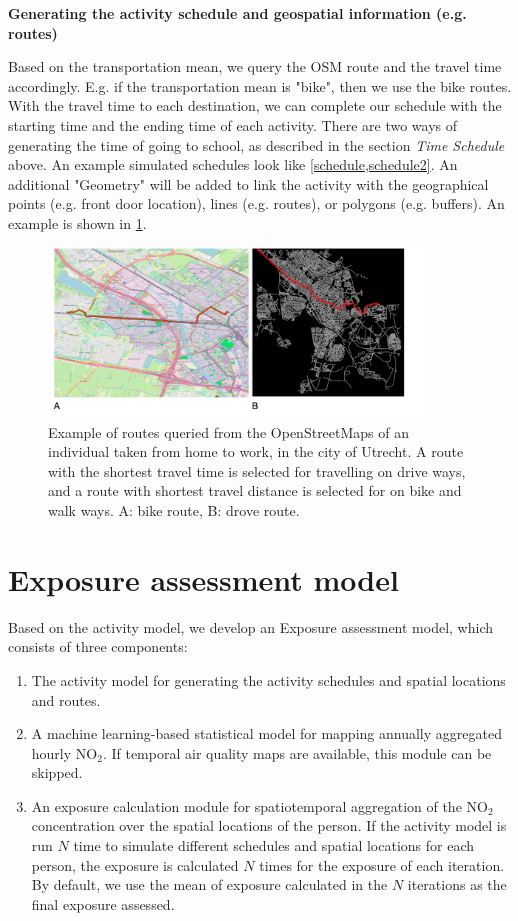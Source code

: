 \documentclass[]{article}
\begin{document}
\textbf{Generating the activity schedule and geospatial information (e.g. routes)}

Based on the transportation mean, we query the OSM route and the travel time accordingly. E.g. if the transportation mean is "bike", then we use the bike routes. With the travel time to each destination, we can complete our schedule with the starting time and the ending time of each activity. There are two ways of generating the time of going to school, as described in the section \textit{Time Schedule} above. An example simulated schedules look like \cref{schedule,schedule2}. An additional "Geometry" will be added to link the activity with the geographical points (e.g. front door location), lines (e.g. routes), or polygons (e.g. buffers). An example is shown in \cref{exampleroute}.
\begin{figure}[!h]
    \centering
    \includegraphics[width=10cm]{figure/route.png}
    \caption{Example of routes queried from the OpenStreetMaps of an individual taken from home to work, in the city of Utrecht. A route with the shortest travel time is selected for travelling on drive ways, and a route with shortest travel distance is selected for on bike and walk ways. A: bike route, B: drove route.}
    \label{exampleroute}
\end{figure}
%


\section{Exposure assessment model}
\label{sec:exp}
 Based on the activity model, we develop an Exposure assessment model, which consists of three components:
 \begin{enumerate}
     \item The activity model for generating the activity schedules and spatial locations and routes. 
     
     \item A machine learning-based statistical model for mapping annually aggregated hourly NO$_2$.  If temporal air quality maps are available, this module can be skipped.
     
     \item An exposure calculation module for spatiotemporal aggregation of the NO$_2$ concentration over the spatial locations of the person. If the activity model is run $N$ time to simulate different schedules and spatial locations for each person, the  exposure is calculated $N$ times for the exposure of each iteration. By default, we use the mean of exposure calculated in the $N$ iterations as the final exposure assessed.   
 \end{enumerate}
\end{document}

